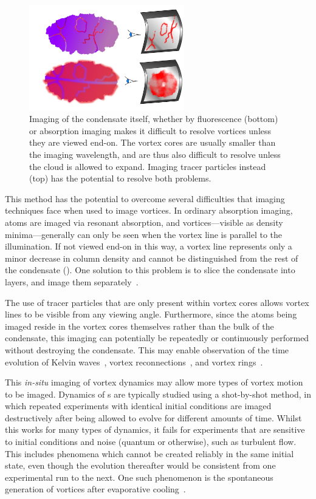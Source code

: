 \begin{figure}
\begin{center}
\includegraphics[width=0.6\textwidth]{figures/unsorted/side-on.pdf}
\caption{\label{fig:side-on}Imaging of the condensate itself, whether by fluorescence (bottom) or absorption imaging makes it difficult to resolve vortices unless they are viewed end-on. The vortex cores are usually smaller than the imaging wavelength, and are thus also difficult to resolve unless the cloud is allowed to expand. Imaging tracer particles instead (top) has the potential to resolve both problems.}\label{fig:side_on}
\end{center}
\end{figure}

This method has the potential to overcome several difficulties that imaging techniques face when used to image vortices. In ordinary absorption imaging, atoms are imaged via resonant absorption, and vortices---visible as density minima---generally can only be seen when the vortex line is parallel to the illumination. If not viewed end-on in this way, a vortex line represents only a minor decrease in column density and cannot be distinguished from the rest of the condensate (). One solution to this problem is to slice the condensate into layers, and image them separately~\cite{anderson_watching_2001}.

The use of tracer particles that are only present within vortex cores allows vortex lines to be visible from any viewing angle.  Furthermore, since the atoms being imaged reside in the vortex cores themselves rather than the bulk of the condensate, this imaging can potentially be repeatedly or continuously performed without destroying the condensate. This may enable observation of the time evolution of Kelvin waves~\cite{bretin_quadrupole_2003}, vortex reconnections~\cite{leadbeater_sound_2001}, and vortex rings~\cite{anderson_watching_2001}.

This \emph{in-situ} imaging of vortex dynamics may allow more types of vortex motion to be imaged. Dynamics of \bec s are typically studied using a shot-by-shot method, in which repeated experiments with identical initial conditions are imaged destructively after being allowed to evolve for different amounts of time. Whilst this works for many types of dynamics, it fails for experiments that are sensitive to initial conditions and noise (quantum or otherwise), such as turbulent flow. This includes phenomena which cannot be created reliably in the same initial state, even though the evolution thereafter would be consistent from one experimental run to the next. One such phenomenon is the spontaneous generation of vortices after evaporative cooling~\cite{weiler_spontaneous_2008}.

